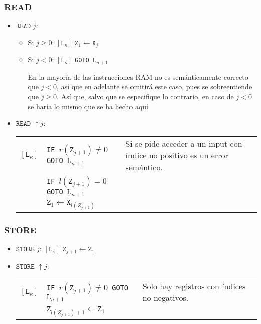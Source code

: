 \documentclass[twoside]{article}
\begin{document}
\subsubsection{READ}
\begin{itemize}
\item $\texttt{READ }j$:
\begin{itemize}
\item Si $j\geq 0$:
$[\texttt{L}_\kappa]\texttt{ Z}_1\leftarrow\texttt{X}_j$
\item Si $j<0$:
$[\texttt{L}_\kappa]$ \texttt{GOTO }$\texttt{L}_{n+1}$


En la mayoría de las instrucciones RAM no es semánticamente correcto que $j<0$, así que en adelante se omitirá este caso, pues se sobreentiende que $j\geq 0$. Así que, salvo que se especifique lo contrario, en caso de $j<0$ se haría lo mismo que se ha hecho aquí
\end{itemize}
\item $\texttt{READ }\uparrow j$:

\begin{tabular}{l l l}
$[\texttt{L}_\kappa]$&\texttt{IF }$r(\texttt{Z}_{j+1})\neq 0$\texttt{ GOTO }$\texttt{L}_{n+1}$ & Si se pide acceder a un input con índice no positivo es un error semántico.\\
& \texttt{IF }$l(\texttt{Z}_{j+1})= 0$\texttt{ GOTO }$\texttt{L}_{n+1}$ &\\
&$\texttt{Z}_1\leftarrow\texttt{X}_{l(Z_{j+1})}$ &
\end{tabular}
\end{itemize}

\subsubsection{STORE}
\begin{itemize}
\item $\texttt{STORE }j$:
$[\texttt{L}_\kappa]\texttt{ Z}_{j+1}\leftarrow\texttt{Z}_1$
\item $\texttt{STORE }\uparrow j$:

\begin{tabular}{l l l}
$[\texttt{L}_\kappa]$&\texttt{IF }$r(\texttt{Z}_{j+1})\neq 0$\texttt{ GOTO }$\texttt{L}_{n+1}$ & Solo hay registros con índices no negativos.\\
& $\texttt{Z}_{l(Z_{j+1})+1}\leftarrow\texttt{Z}_1$ &
\end{tabular}
\end{itemize}

\newpage
\end{document}
